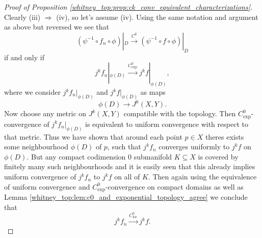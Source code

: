 \begin{proof}[Proof of Proposition \ref{whitney_top:prop:ck_conv_equivalent_characterizations}]
    Clearly (iii) $\Rightarrow$ (iv), so let's assume (iv). Using the same notation and argument as above but reversed we see that 
    \[
    (\psi^{-1} \circ f_n \circ \phi)|_D \xrightarrow{C^k} (\psi^{-1} \circ f \circ \phi)|_D
    \]
    if and only if 
    \[
    j^kf_n|_{\phi(D)} \xrightarrow{C^0_\mathrm{exp}} j^kf|_{\phi(D)},
    \]
    where we consider $j^kf_n|_{\phi(D)}$ and $j^kf|_{\phi(D)}$ as maps 
    \[
    \phi(D) \to J^k(X,Y).
    \]
    Now choose any metric on $J^k(X,Y)$ compatible with the topology. Then $C^0_\mathrm{exp}$-convergence of $j^kf_n|_{\phi(D)}$ is equivalent to uniform convergence with respect to that metric. Thus we have shown that around each point $p \in X$ theres exists some neighbourhood $\phi(D)$ of $p$, such that $j^kf_n$ converges uniformly to $j^kf$ on $\phi(D)$. But any compact codimension $0$ submanifold $K\subseteq X$ is covered by finitely many such neighbourhoods and it is easily seen that this already implies uniform convergence of $j^kf_n$ to $j^kf$ on all of $K$. Then again using the equivalence of uniform convergence and $C^0_\mathrm{exp}$-convergence on compact domains as well as Lemma \ref{whitney_top:lem:c0_and_exponential_topology_agree} we conclude that 
    \[
    j^kf_n \xrightarrow{C^0_\mathrm{loc}} j^kf.
    \]
\end{proof}